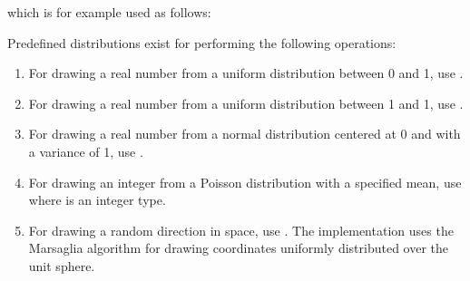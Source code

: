 \documentclass[letterpaper,10pt,english]{sphinxmanual}
\begin{document}
\begin{sphinxVerbatim}[commandchars=\\\{\},formatcom=\scriptsize]
 
  
\end{sphinxVerbatim}

\sphinxAtStartPar
which is for example used as follows:

\begin{sphinxVerbatim}[commandchars=\\\{\},formatcom=\scriptsize]
  

    
\end{sphinxVerbatim}

\sphinxAtStartPar
Pre\sphinxhyphen{}defined distributions exist for performing the following operations:
\begin{enumerate}
%
\item {} 
\sphinxAtStartPar
For drawing a real number from a uniform distribution between 0 and 1, use .

\item {} 
\sphinxAtStartPar
For drawing a real number from a uniform distribution between \sphinxhyphen{}1 and 1, use .

\item {} 
\sphinxAtStartPar
For drawing a real number from a normal distribution centered at 0 and with a variance of 1, use .

\item {} 
\sphinxAtStartPar
For drawing an integer from a Poisson distribution with a specified mean, use  where  is an integer type.

\item {} 
\sphinxAtStartPar
For drawing a random direction in space, use .
The implementation uses the Marsaglia algorithm for drawing coordinates uniformly distributed over the unit sphere.

\end{enumerate}
\end{document}
